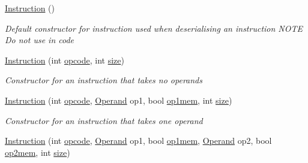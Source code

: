 \begin{DoxyCompactItemize}
\item 
\hyperlink{class_c_p_u___o_s___simulator_1_1_c_p_u_1_1_instruction_a2038c543e7b47a5997405f56cb8c7aa9}{Instruction} ()
\begin{DoxyCompactList}\small\item\em Default constructor for instruction used when deserialising an instruction N\+O\+T\+E Do not use in code \end{DoxyCompactList}\item 
\hyperlink{class_c_p_u___o_s___simulator_1_1_c_p_u_1_1_instruction_ac1fdbf424188acb7f10a1fa93e12a559}{Instruction} (int \hyperlink{class_c_p_u___o_s___simulator_1_1_c_p_u_1_1_instruction_aa8fa753bf6e1b6ffff7060ec90f930af}{opcode}, int \hyperlink{class_c_p_u___o_s___simulator_1_1_c_p_u_1_1_instruction_a8c533b0c08d8ac0a85b0e342f95cfeec}{size})
\begin{DoxyCompactList}\small\item\em Constructor for an instruction that takes no operands \end{DoxyCompactList}\item 
\hyperlink{class_c_p_u___o_s___simulator_1_1_c_p_u_1_1_instruction_a66a7be80a626d026918739af6f4b5d7a}{Instruction} (int \hyperlink{class_c_p_u___o_s___simulator_1_1_c_p_u_1_1_instruction_aa8fa753bf6e1b6ffff7060ec90f930af}{opcode}, \hyperlink{class_c_p_u___o_s___simulator_1_1_c_p_u_1_1_operand}{Operand} op1, bool \hyperlink{class_c_p_u___o_s___simulator_1_1_c_p_u_1_1_instruction_ad39c82c478ef1de45aae7cf7cf38575b}{op1mem}, int \hyperlink{class_c_p_u___o_s___simulator_1_1_c_p_u_1_1_instruction_a8c533b0c08d8ac0a85b0e342f95cfeec}{size})
\begin{DoxyCompactList}\small\item\em Constructor for an instruction that takes one operand \end{DoxyCompactList}\item 
\hyperlink{class_c_p_u___o_s___simulator_1_1_c_p_u_1_1_instruction_a53534336be838f76477f8b27bdb099b8}{Instruction} (int \hyperlink{class_c_p_u___o_s___simulator_1_1_c_p_u_1_1_instruction_aa8fa753bf6e1b6ffff7060ec90f930af}{opcode}, \hyperlink{class_c_p_u___o_s___simulator_1_1_c_p_u_1_1_operand}{Operand} op1, bool \hyperlink{class_c_p_u___o_s___simulator_1_1_c_p_u_1_1_instruction_ad39c82c478ef1de45aae7cf7cf38575b}{op1mem}, \hyperlink{class_c_p_u___o_s___simulator_1_1_c_p_u_1_1_operand}{Operand} op2, bool \hyperlink{class_c_p_u___o_s___simulator_1_1_c_p_u_1_1_instruction_ac414328ee54248a148c485a08a7eff44}{op2mem}, int \hyperlink{class_c_p_u___o_s___simulator_1_1_c_p_u_1_1_instruction_a8c533b0c08d8ac0a85b0e342f95cfeec}{size})

\end{DoxyCompactItemize}
